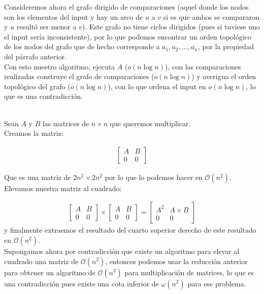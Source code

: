 \documentclass[dcc,uchile]{fcfmcourse}
\theoremstyle{plain}
\theoremstyle{definition}
\begin{document}
\begin{problems}
  Consideremos ahora el grafo dirigido de comparaciones (aquel donde los nodos son los elementos del input y hay un arco de $u$ a $v$ si es que ambos se compararon y $u$ resultó ser menor a $v$). Este grafo no tiene ciclos dirigidos (pues si tuviese uno el input sería inconsistente), por lo que podemos encontrar un orden topológico de los nodos del grafo que de hecho corresponde a $a_{1}, a_{2}, \ldots, a_{n}$, por la propiedad del párrafo anterior.\\
  
  Con esto nuestro algoritmo, ejecuta $A$ ($o(n\log{n})$), con las comparaciones realizadas construye el grafo de comparaciones ($o(n\log{n})$) y averigua el orden topológico del grafo ($o(n\log{n})$), con lo que ordena el input en $o(n\log{n})$, lo que es una contradicción.
 
\\
 Sean $A$ y $B$ las matrices de $n\times n$ que queremos multiplicar. \\
 Creamos la matriz:
 
 \begin{align*}
     \begin{bmatrix}
    A       & B \\
    0      & 0
\end{bmatrix}
\end{align*}

Que es una matriz de $2n^2\times 2n^2$ por lo que lo podemos hacer en $\mathcal{O}(n^2)$.\\
Elevamos nuestra matriz al cuadrado:

\begin{align*}
\begin{bmatrix}
    A       & B \\
    0      & 0
\end{bmatrix}
\times\begin{bmatrix}
    A       & B \\
    0      & 0
\end{bmatrix}
= \begin{bmatrix}
    A^2      & A\times B \\
    0      & 0
\end{bmatrix}
\end{align*} 
 y finalmente extraemos el resultado del cuarto superior derecho de este resultado en $\mathcal{O}(n^2)$.\\
 
 Supongamos ahora por contradicción que existe un algoritmo para elevar al cuadrado una matriz de $\mathcal{O}(n^2)$, entonces podemos usar la reducción anterior para obtener un algoritmo de $\mathcal{O}(n^2)$ para multiplicación de matrices, lo que es una contradicción pues existe una cota inferior de $\omega(n^2)$ para ese problema.
\end{problems}
\end{document}
